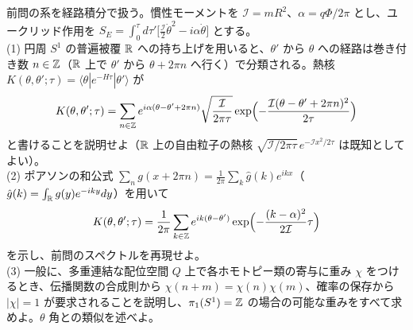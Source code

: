 \begin{problem}[難易度 D]\label{ch02-prob-pathint}
前問の系を経路積分で扱う。慣性モーメントを $\mathcal I=mR^2$、$\alpha=q\Phi/2\pi$ とし、ユークリッド作用を $S_E=\int_0^\tau d\tau'\bigl[\tfrac{\mathcal I}{2}\dot\theta^2-i\alpha\dot\theta\bigr]$ とする。\\
(1) 円周 $S^1$ の普遍被覆 $\mathbb{R}$ への持ち上げを用いると、$\theta'$ から $\theta$ への経路は巻き付き数 $n\in\mathbb{Z}$（$\mathbb{R}$ 上で $\theta'$ から $\theta+2\pi n$ へ行く）で分類される。熱核 $K(\theta,\theta';\tau)=\langle\theta|e^{-H\tau}|\theta'\rangle$ が
\[
K(\theta,\theta';\tau)=\sum_{n\in\mathbb{Z}}e^{i\alpha(\theta-\theta'+2\pi n)}\sqrt{\frac{\mathcal I}{2\pi\tau}}\exp\Bigl(-\frac{\mathcal I(\theta-\theta'+2\pi n)^2}{2\tau}\Bigr)
\]
と書けることを説明せよ（$\mathbb{R}$ 上の自由粒子の熱核 $\sqrt{\mathcal I/2\pi\tau}\,e^{-\mathcal I x^2/2\tau}$ は既知としてよい）。\\
(2) ポアソンの和公式 $\sum_ng(x+2\pi n)=\frac{1}{2\pi}\sum_k\hat g(k)e^{ikx}$（$\hat g(k)=\int_{\mathbb{R}} g(y)e^{-iky}dy$）を用いて
\[
K(\theta,\theta';\tau)=\frac{1}{2\pi}\sum_{k\in\mathbb{Z}}e^{ik(\theta-\theta')}\exp\Bigl(-\frac{(k-\alpha)^2}{2\mathcal I}\tau\Bigr)
\]
を示し、前問のスペクトルを再現せよ。\\
(3) 一般に、多重連結な配位空間 $Q$ 上で各ホモトピー類の寄与に重み $\chi$ をつけるとき、伝播関数の合成則から $\chi(n+m)=\chi(n)\chi(m)$、確率の保存から $\lvert\chi\rvert=1$ が要求されることを説明し、$\pi_1(S^1)=\mathbb{Z}$ の場合の可能な重みをすべて求めよ。$\theta$ 角との類似を述べよ。
\end{problem}

